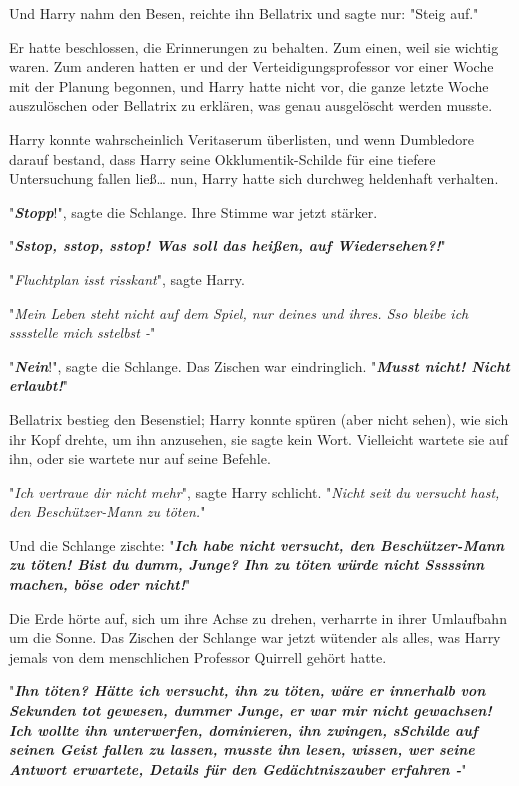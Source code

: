 {Und Harry nahm den Besen, reichte ihn Bellatrix und sagte nur: "Steig auf."

Er hatte beschlossen, die Erinnerungen zu behalten. Zum einen, weil sie wichtig waren. Zum anderen hatten er und der Verteidigungsprofessor vor einer Woche mit der Planung begonnen, und Harry hatte nicht vor, die ganze letzte Woche auszulöschen oder Bellatrix zu erklären, was genau ausgelöscht werden musste.

Harry konnte wahrscheinlich Veritaserum überlisten, und wenn Dumbledore darauf bestand, dass Harry seine Okklumentik-Schilde für eine tiefere Untersuchung fallen ließ… nun, Harry hatte sich durchweg heldenhaft verhalten.

"\textbf{\emph{Stopp}}!", sagte die Schlange. Ihre Stimme war jetzt stärker.

"\textbf{\emph{Sstop, sstop, sstop! Was soll das heißen, auf Wiedersehen?!}}"

"\emph{Fluchtplan isst risskant}", sagte Harry.

"\emph{Mein Leben steht nicht auf dem Spiel, nur deines und ihres. Sso bleibe ich sssstelle mich sstelbst -}"

"\textbf{\emph{Nein}}!", sagte die Schlange. Das Zischen war eindringlich. "\textbf{\emph{Musst nicht! Nicht erlaubt!}}"

Bellatrix bestieg den Besenstiel; Harry konnte spüren (aber nicht sehen), wie sich ihr Kopf drehte, um ihn anzusehen, sie sagte kein Wort. Vielleicht wartete sie auf ihn, oder sie wartete nur auf seine Befehle.

"\emph{Ich vertraue dir nicht mehr}", sagte Harry schlicht. "\emph{Nicht seit du versucht hast, den Beschützer-Mann zu töten.}"

Und die Schlange zischte: "\textbf{\emph{Ich habe nicht versucht, den Beschützer-Mann zu töten! Bist du dumm, Junge? Ihn zu töten würde nicht Sssssinn machen, böse oder nicht!}}"

Die Erde hörte auf, sich um ihre Achse zu drehen, verharrte in ihrer Umlaufbahn um die Sonne. Das Zischen der Schlange war jetzt wütender als alles, was Harry jemals von dem menschlichen Professor Quirrell gehört hatte.

"\textbf{\emph{Ihn töten? Hätte ich versucht, ihn zu töten, wäre er innerhalb von Sekunden tot gewesen, dummer Junge, er war mir nicht gewachsen! Ich wollte ihn unterwerfen, dominieren, ihn zwingen, sSchilde auf seinen Geist fallen zu lassen, musste ihn lesen, wissen, wer seine Antwort erwartete, Details für den Gedächtniszauber erfahren -}}"

}
